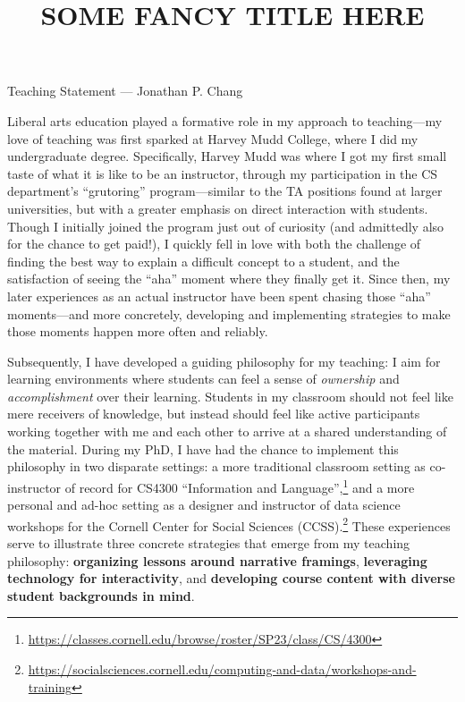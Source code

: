 \documentclass[11pt,letterpaper]{article}
\title{SOME FANCY TITLE HERE}
\begin{document}
\maketitle

\begin{center}
Teaching Statement --- Jonathan P. Chang
\end{center}

Liberal arts education played a formative role in my approach to teaching---my love of teaching was first sparked at Harvey Mudd College, where I did my undergraduate degree.
Specifically, Harvey Mudd was where I got my first small taste of what it is like to be an instructor, through my participation in the CS department's ``grutoring'' program---similar to the TA positions found at larger universities, but with a greater emphasis on direct interaction with students.
Though I initially joined the program just out of curiosity (and admittedly also for the chance to get paid!), I quickly fell in love with both the challenge of finding the best way to explain a difficult concept to a student, and the satisfaction of seeing the ``aha'' moment where they finally get it.
Since then, my later experiences as an actual instructor have been spent chasing those ``aha'' moments---and more concretely, developing and implementing strategies to make those moments happen more often and reliably.

Subsequently, I have developed a guiding philosophy for my teaching: I aim for learning environments where students can feel a sense of \emph{ownership} and \emph{accomplishment} over their learning.
Students in my classroom should not feel like mere receivers of knowledge, but instead should feel like active participants working together with me and each other to arrive at a shared understanding of the material.
During my PhD, I have had the chance to implement this philosophy in two disparate settings: a more traditional classroom setting as co-instructor of record for CS4300 ``Information and Language'',\footnote{\url{https://classes.cornell.edu/browse/roster/SP23/class/CS/4300}} and a more personal and ad-hoc setting as a designer and instructor of data science workshops for the Cornell Center for Social Sciences (CCSS).\footnote{\url{https://socialsciences.cornell.edu/computing-and-data/workshops-and-training}}
These experiences serve to illustrate three concrete strategies that emerge from my teaching philosophy: \textbf{organizing lessons around narrative framings}, \textbf{leveraging technology for interactivity}, and \textbf{developing course content with diverse student backgrounds in mind}.
\end{document}
